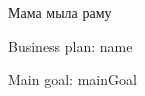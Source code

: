 \documentclass[a4paper,12pt]{article}
\begin{document}
  Мама мыла раму

  Business plan: {{ name }}
  
  Main goal: {{ mainGoal }}
\end{document}
